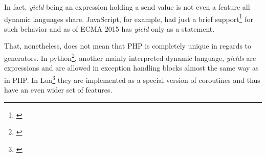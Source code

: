 In fact, \emph{yield} being an expression holding a send value is not even a feature all dynamic languages share. JavaScript, for example, had just a brief support\footnote{\citep{ECMAYield}} for such behavior and as of ECMA 2015 has \emph{yield} only as a statement.

That, nonetheless, does not mean that PHP is completely unique in regards to generators. In python\footnote{\citep{PythonYield}}, another mainly interpreted dynamic language, \emph{yields} are expressions and are allowed in exception handling blocks almost the same way as in PHP. In Lua\footnote{\citep{LUAYield}} they are implemented as a special version of coroutines and thus have an even wider set of features.




